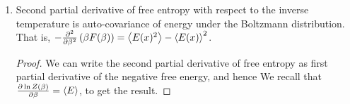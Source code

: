\documentclass[letterpaper,english,10pt]{article}
\begin{document}
\begin{lem}
\begin{enumerate}
\begin{proof}
Therefore, we recognize that
\end{proof}
\item Second partial derivative of free entropy with respect to the inverse temperature is auto-covariance of energy under the Boltzmann distribution. 
That is, $-\frac{\partial ^2}{\partial \beta^2} \left( \beta F(\beta) \right)=\left\langle E(x)^2 \right\rangle-\left\langle E(x) \right\rangle^2$. 
\begin{proof} 
We can write the second partial derivative of free entropy as first partial derivative of the negative free energy, 
and hence 
We recall that $\frac{\partial \ln Z(\beta)}{\partial \beta} = \left\langle E\right\rangle$, to get the result.
\end{proof}
\end{enumerate}
\end{lem}
\end{document}
